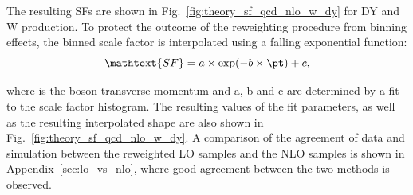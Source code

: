 The resulting SFs are shown in Fig.~\ref{fig:theory_sf_qcd_nlo_w_dy} for DY and W production. To protect the outcome of the reweighting procedure from binning effects, the binned scale factor is interpolated using a falling exponential function:
\begin{equation}
\mathtext{SF} = a\times \exp(-b\times\pt) + c,
\end{equation}

where \pt is the boson transverse momentum and a, b and c are determined by a fit to the scale factor histogram. The resulting values of the fit parameters, as well as the resulting interpolated shape are also shown in Fig.~\ref{fig:theory_sf_qcd_nlo_w_dy}. A comparison of the agreement of data and simulation between the reweighted LO samples and the NLO samples is shown in Appendix~\ref{sec:lo_vs_nlo}, where good agreement between the two methods is observed. 

